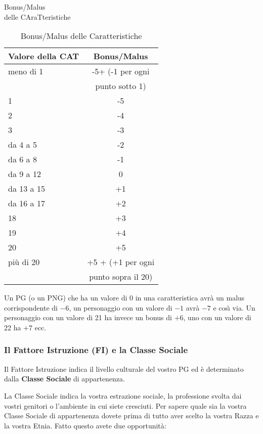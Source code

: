 \begin{table}[hbt]
\centering

{\Large\sc Bonus/Malus\\delle CAraTteristiche\medskip}

\begin{tabular}{|l|c|}
\hline Valore della CAT & Bonus/Malus \\ \hline\hline
meno di 1 & -5+ (-1 per ogni\\
 & punto sotto 1) \\ \hline
1 & -5\\ \hline
2 & -4\\  \hline
3 &-3 \\  \hline
da 4 a 5& -2\\ \hline
da 6 a 8& -1 \\  \hline
da 9 a 12& 0 \\  \hline
da 13 a 15& +1 \\  \hline
da 16 a 17& +2 \\  \hline
18 &+3 \\  \hline
19 &+4 \\  \hline
20 &+5 \\  \hline
pi\`u di 20& +5 + (+1 per ogni\\
 &  punto sopra il 20)\\  \hline
\end{tabular}
\caption{Bonus/Malus delle Caratteristiche}
\label{tabbonuscat}
\end{table}

Un PG (o un PNG) che ha un valore di 0 in una caratteristica avr\`a un
malus corrispondente di $-6$, un personaggio con un valore di $-1$ avr\`a
$-7$ e cos\`{\i} via. Un personaggio con un valore di 21 ha invece un
bonus di $+6$, uno con un valore di 22 ha $+7$ ecc.

{\raggedright \subsubsection{Il Fattore Istruzione (FI) e la Classe Sociale}}

Il Fattore Istruzione indica il livello culturale del vostro PG ed
\`e determinato dalla \textbf{Classe Sociale} di appartenenza. 

La Classe Sociale indica la vostra estrazione sociale, la professione
svolta dai vostri genitori o l'ambiente in cui siete cresciuti. Per
sapere quale sia la vostra Classe Sociale di appartenenza dovete prima
di tutto aver scelto la vostra Razza e la vostra Etnia.  Fatto questo
avete due opportunit\`a:


